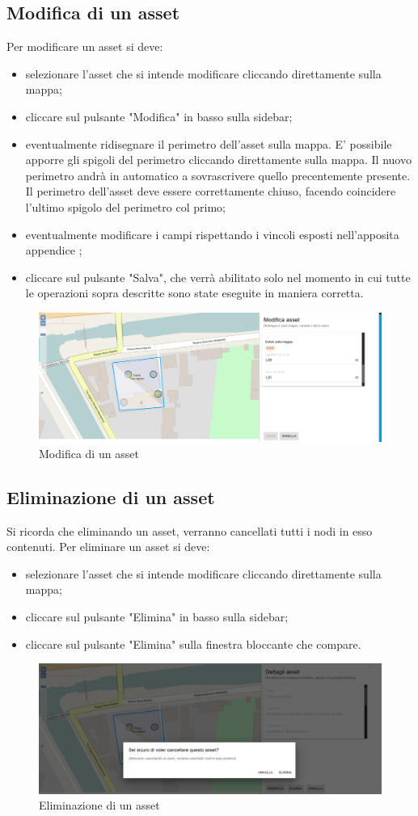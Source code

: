 \subsection{Modifica di un asset}
	Per modificare un asset si deve:
	\begin{itemize}
		\item selezionare l'asset che si intende modificare cliccando direttamente sulla mappa;
		\item cliccare sul pulsante "Modifica" in basso sulla sidebar;
		\item eventualmente ridisegnare il perimetro dell'asset sulla mappa. E' possibile apporre gli spigoli del perimetro cliccando direttamente sulla mappa. Il nuovo perimetro andrà in automatico a sovrascrivere quello precentemente presente. Il perimetro dell'asset deve essere correttamente chiuso, facendo coincidere l'ultimo spigolo del perimetro col primo;
		\item eventualmente modificare i campi rispettando i vincoli esposti nell'apposita appendice ;
		\item cliccare sul pulsante "Salva", che verrà abilitato solo nel momento in cui tutte le operazioni sopra descritte sono state eseguite in maniera corretta.
	\end{itemize}
	
	\begin{figure}[H]
	\centering
	\includegraphics[width=\textwidth]{img/modifica_asset.png}
	\caption{Modifica di un asset}
	\end{figure}

\subsection{Eliminazione di un asset}
Si ricorda che eliminando un asset, verranno cancellati tutti i nodi in esso contenuti.
Per eliminare un asset si deve:
\begin{itemize}
	\item selezionare l'asset che si intende modificare cliccando direttamente sulla mappa;
	\item cliccare sul pulsante "Elimina" in basso sulla sidebar;
	\item cliccare sul pulsante "Elimina" sulla finestra bloccante che compare.
\end{itemize}

\begin{figure}[H]
\centering
\includegraphics[width=\textwidth]{img/eliminazione_bloccante_asset.png}
\caption{Eliminazione di un asset}
\end{figure}